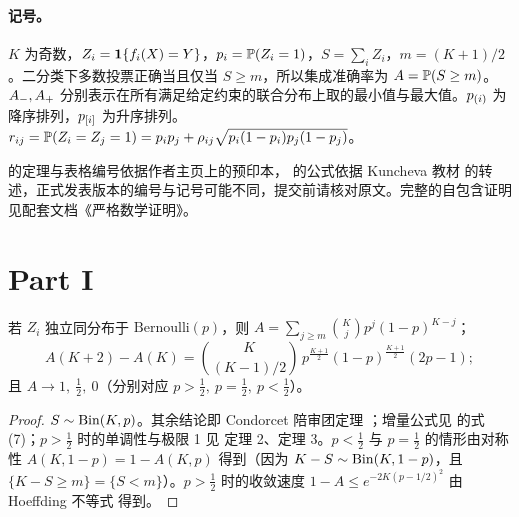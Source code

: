 \documentclass[11pt]{article}
\begin{document}

\paragraph{记号。}$K$ 为奇数，$Z_i=\mathbf{1}\{f_i(X)=Y\}$，$p_i=\mathbb{P}(Z_i=1)$，$S=\sum_iZ_i$，$m=(K+1)/2$。二分类下多数投票正确当且仅当 $S\ge m$，所以集成准确率为 $A=\mathbb{P}(S\ge m)$。$A_{-},A_{+}$ 分别表示在所有满足给定约束的联合分布上取的最小值与最大值。$p_{(i)}$ 为降序排列，$p_{[i]}$ 为升序排列。$r_{ij}=\mathbb{P}(Z_i=Z_j=1)=p_ip_j+\rho_{ij}\sqrt{p_i(1-p_i)p_j(1-p_j)}$。

\begin{warnbox}[title=引用说明]
\cite{zk2012,kaniovski2010} 的定理与表格编号依据作者主页上的预印本，\cite{matan} 的公式依据 Kuncheva 教材 \cite{kunchevabook} 的转述，正式发表版本的编号与记号可能不同，提交前请核对原文。完整的自包含证明见配套文档《严格数学证明》。
\end{warnbox}

\section{Part I}

\begin{theorem}[独立情形]\label{c:ind}
若 $Z_i$ 独立同分布于 $\mathrm{Bernoulli}(p)$，则 $A=\sum_{j\ge m}\binom Kj p^j(1-p)^{K-j}$；
\[
A(K+2)-A(K)=\binom{K}{(K-1)/2}\,p^{\frac{K+1}{2}}(1-p)^{\frac{K+1}{2}}(2p-1);
\]
且 $A\to1,\ \tfrac12,\ 0$（分别对应 $p>\tfrac12,\ p=\tfrac12,\ p<\tfrac12$）。
\end{theorem}
\begin{proof}
$S\sim\operatorname{Bin}(K,p)$。其余结论即 Condorcet 陪审团定理 \cite{condorcet}；增量公式见 \cite{shteingart} 的式 (7)；$p>\frac12$ 时的单调性与极限 1 见 \cite{shteingart} 定理 2、定理 3。$p<\frac12$ 与 $p=\frac12$ 的情形由对称性 $A(K,1-p)=1-A(K,p)$ 得到（因为 $K-S\sim\operatorname{Bin}(K,1-p)$，且 $\{K-S\ge m\}=\{S<m\}$）。$p>\frac12$ 时的收敛速度 $1-A\le e^{-2K(p-1/2)^2}$ 由 Hoeffding 不等式 \cite{hoeffding} 得到。
\end{proof}
\end{document}
